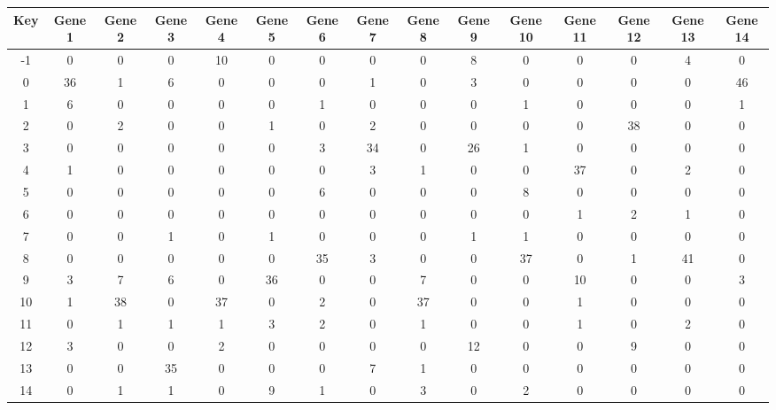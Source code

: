 \begin{tabular}{|c|c|c|c|c|c|c|c|c|c|c|c|c|c|c|}
\hline
Key & Gene 1 & Gene 2 & Gene 3 & Gene 4 & Gene 5 & Gene 6 & Gene 7 & Gene 8 & Gene 9 & Gene 10 & Gene 11 & Gene 12 & Gene 13 & Gene 14 \\
\hline
-1 & 0 & 0 & 0 & 10 & 0 & 0 & 0 & 0 & 8 & 0 & 0 & 0 & 4 & 0 \\
0 & 36 & 1 & 6 & 0 & 0 & 0 & 1 & 0 & 3 & 0 & 0 & 0 & 0 & 46 \\
1 & 6 & 0 & 0 & 0 & 0 & 1 & 0 & 0 & 0 & 1 & 0 & 0 & 0 & 1 \\
2 & 0 & 2 & 0 & 0 & 1 & 0 & 2 & 0 & 0 & 0 & 0 & 38 & 0 & 0 \\
3 & 0 & 0 & 0 & 0 & 0 & 3 & 34 & 0 & 26 & 1 & 0 & 0 & 0 & 0 \\
4 & 1 & 0 & 0 & 0 & 0 & 0 & 3 & 1 & 0 & 0 & 37 & 0 & 2 & 0 \\
5 & 0 & 0 & 0 & 0 & 0 & 6 & 0 & 0 & 0 & 8 & 0 & 0 & 0 & 0 \\
6 & 0 & 0 & 0 & 0 & 0 & 0 & 0 & 0 & 0 & 0 & 1 & 2 & 1 & 0 \\
7 & 0 & 0 & 1 & 0 & 1 & 0 & 0 & 0 & 1 & 1 & 0 & 0 & 0 & 0 \\
8 & 0 & 0 & 0 & 0 & 0 & 35 & 3 & 0 & 0 & 37 & 0 & 1 & 41 & 0 \\
9 & 3 & 7 & 6 & 0 & 36 & 0 & 0 & 7 & 0 & 0 & 10 & 0 & 0 & 3 \\
10 & 1 & 38 & 0 & 37 & 0 & 2 & 0 & 37 & 0 & 0 & 1 & 0 & 0 & 0 \\
11 & 0 & 1 & 1 & 1 & 3 & 2 & 0 & 1 & 0 & 0 & 1 & 0 & 2 & 0 \\
12 & 3 & 0 & 0 & 2 & 0 & 0 & 0 & 0 & 12 & 0 & 0 & 9 & 0 & 0 \\
13 & 0 & 0 & 35 & 0 & 0 & 0 & 7 & 1 & 0 & 0 & 0 & 0 & 0 & 0 \\
14 & 0 & 1 & 1 & 0 & 9 & 1 & 0 & 3 & 0 & 2 & 0 & 0 & 0 & 0 \\
\hline
\end{tabular}